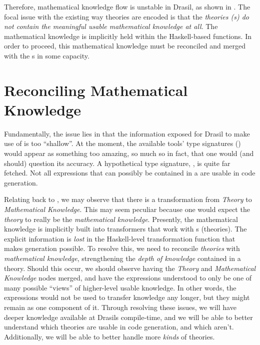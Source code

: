 Therefore, mathematical knowledge flow is unstable in Drasil, as shown in
. The focal issue with the existing way theories
are encoded is that the \textit{theories (\RelationConcept{}s) do not contain
	the meaningful usable mathematical knowledge at all}. The mathematical knowledge
is implicitly held within the Haskell-based functions. In order to proceed, this mathematical knowledge
must be reconciled and merged with the \RelationConcept{}s in some capacity.

\theoriesWithoutModelKinds{}

\section{Reconciling Mathematical Knowledge}

Fundamentally, the issue lies in that the information exposed for Drasil to make
use of is too ``shallow''. At the moment, the available tools' type signatures
() would appear as something too amazing, so much so
in fact, that one would (and should) question its accuracy. A hypothetical type
signature, , is quite far fetched. Not all
expressions that can possibly be contained in a \RelationConcept{} are usable in
code generation.

Relating back to , we may observe that there is a
transformation from \textit{Theory} to \textit{Mathematical Knowledge}. This may
seem peculiar because one would expect the \textit{theory} to really be the
\textit{mathematical knowledge}. Presently, the mathematical knowledge is
implicitly built into transformers that work with \RelationConcept{}s
(theories). The explicit information is \textit{lost} in the Haskell-level
transformation function that makes generation possible. To resolve this, we need
to reconcile \textit{theories} with \textit{mathematical knowledge},
strengthening the \textit{depth of knowledge} contained in a theory. Should this
occur, we should observe  having the
\textit{Theory} and \textit{Mathematical Knowledge} nodes merged, and have the
expressions understood to only be one of many possible ``views'' of higher-level
usable knowledge. In other words, the expressions would not be used to transfer
knowledge any longer, but they might remain as one component of it. Through
resolving these issues, we will have deeper knowledge available at Drasils
compile-time, and we will be able to better understand which theories are usable
in code generation, and which aren't. Additionally, we will be able to better
handle more \textit{kinds} of theories.

